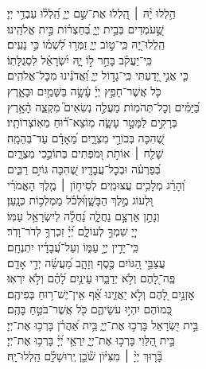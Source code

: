 \documentclass[twoside, openany, parskip=half, 11pt]{book}
\begin{document}
\begin{narrow}
הַ֥לְלוּ יָ֨הּ ׀ \hfill \break
 הַֽ֭לְלוּ אֶת־שֵׁ֣ם יְיָ֑ \hfill הַֽ֝לְל֗וּ עַבְדֵ֥י יְיָ׃ \\
 שֶׁ֣֭עֹמְדִים בְּבֵ֣ית יְיָ֑ \hfill בְּ֝חַצְר֗וֹת בֵּ֣ית אֱלֹהֵֽינוּ׃ \\
 הַֽלְלוּ־יָ֭הּ כִּֽי־ט֣וֹב יְיָ֑ \hfill זַמְּר֥וּ לִ֝שְׁמ֗וֹ כִּ֣י נָעִֽים׃ \\
 כִּֽי־יַעֲקֹ֗ב בָּחַ֣ר ל֣וֹ יָ֑הּ \hfill יִ֝שְׂרָאֵ֗ל לִסְגֻלָּתֽוֹ׃ \\
 כִּ֤י אֲנִ֣י יָ֭דַעְתִּי כִּֽי־גָד֣וֹל יְיָ֑ \hfill וַ֝אֲדֹנֵ֗ינוּ מִכׇּל־אֱלֹהִֽים׃ \\
 כֹּ֤ל אֲשֶׁר־חָפֵ֥ץ יְיָ֗ עָ֫שָׂ֥ה \hfill בַּשָּׁמַ֥יִם וּבָאָ֑רֶץ\\ בַּ֝יַּמִּ֗ים וְכׇל־תְּהֹמֽוֹת׃ \hfill
 מַעֲלֶ֣ה נְשִׂאִים֮ מִקְצֵ֢ה הָ֫אָ֥רֶץ\\ בְּרָקִ֣ים לַמָּטָ֣ר עָשָׂ֑ה \hfill מֽוֹצֵא־ר֗֝וּחַ מֵאֽוֹצְרוֹתָֽיו׃ \\
 שֶׁ֭הִכָּה בְּכוֹרֵ֣י מִצְרָ֑יִם \hfill מֵ֝אָדָ֗ם עַד־בְּהֵמָֽה׃ \\
 שָׁלַ֤ח ׀ אוֹתֹ֣ת וּ֭מֹפְתִים \hfill בְּתוֹכֵ֣כִי מִצְרָ֑יִם\\ בְּ֝פַרְעֹ֗ה וּבְכׇל־עֲבָדָֽיו׃ \hfill
 שֶׁ֭הִכָּה גּוֹיִ֣ם רַבִּ֑ים\\ וְ֝הָרַ֗ג מְלָכִ֥ים עֲצוּמִֽים׃ \hfill
 לְסִיח֤וֹן ׀ מֶ֤לֶךְ הָאֱמֹרִ֗י\\ וּ֭לְעוֹג מֶ֣לֶךְ הַבָּשָׁ֑ן\hfill וּ֝לְכֹ֗ל מַמְלְכ֥וֹת כְּנָֽעַן׃ \\
 וְנָתַ֣ן אַרְצָ֣ם נַחֲלָ֑ה \hfill נַ֝חֲלָ֗ה לְיִשְׂרָאֵ֥ל עַמּֽוֹ׃ \\
 יְיָ֭ שִׁמְךָ֣ לְעוֹלָ֑ם \hfill יְ֝יָ֗ זִכְרְךָ֥ לְדֹר־וָדֹֽר׃ \\
 כִּֽי־יָדִ֣ין יְיָ֣ עַמּ֑וֹ \hfill וְעַל־עֲ֝בָדָ֗יו יִתְנֶחָֽם׃ \\
 עֲצַבֵּ֣י הַ֭גּוֹיִם כֶּ֣סֶף וְזָהָ֑ב \hfill מַ֝עֲשֵׂ֗ה יְדֵ֣י אָדָֽם׃ \\
 פֶּֽה־לָ֭הֶם וְלֹ֣א יְדַבֵּ֑רוּ \hfill עֵינַ֥יִם לָ֝הֶ֗ם וְלֹ֣א יִרְאֽוּ׃ \\
 אׇזְנַ֣יִם לָ֭הֶם וְלֹ֣א יַאֲזִ֑ינוּ \hfill אַ֗֝ף אֵין־יֶשׁ־ר֥וּחַ בְּפִיהֶֽם׃ \\
 כְּ֭מוֹהֶם יִהְי֣וּ עֹשֵׂיהֶ֑ם \hfill כֹּ֖ל אֲשֶׁר־בֹּטֵ֣חַ בָּהֶֽם׃ \\
 בֵּ֣ית יִ֭שְׂרָאֵל בָּרְכ֣וּ אֶת־יְיָ֑ \hfill בֵּ֥ית אַ֝הֲרֹ֗ן בָּרְכ֥וּ אֶת־יְיָ׃ \\
 בֵּ֣ית הַ֭לֵּוִי בָּרְכ֣וּ אֶת־יְיָ֑ \hfill יִֽרְאֵ֥י יְ֝יָ֗ בָּרְכ֥וּ אֶת־יְיָ׃ \\
 בָּ֘ר֤וּךְ יְיָ֨ ׀ מִצִּיּ֗וֹן שֹׁ֘כֵ֤ן יְֽרוּשָׁלָ֗‍ִם \hfill הַֽלְלוּ־יָֽהּ׃ \\



\end{narrow}
\end{document}
